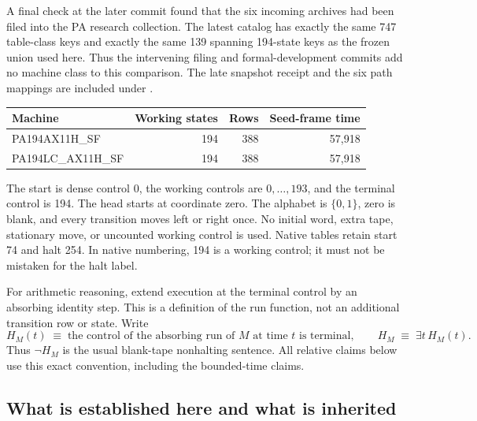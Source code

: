\documentclass[11pt,letterpaper]{article}
\newcommand{\file}[1]{\path{#1}}
\begin{document}
A final check at the later commit
 found that the six incoming
archives had been filed into the PA research collection. The latest catalog
has exactly the same 747 table-class keys and exactly the same 139 spanning
194-state keys as the frozen union used here. Thus the intervening filing
and formal-development commits add no machine class to this comparison.
The late snapshot receipt and the six path mappings are included under
\file{comparison/}.

\begin{center}
\begin{tabular}{@{}lrrr@{}}
\toprule
Machine & Working states & Rows & Seed-frame time\\
\midrule
PA194AX11H\_SF & 194 & 388 & 57,918\\
PA194LC\_AX11H\_SF & 194 & 388 & 57,918\\
\bottomrule
\end{tabular}
\end{center}

The start is dense control 0, the working controls are $0,\ldots,193$, and
the terminal control is 194. The head starts at coordinate zero. The alphabet
is $\{0,1\}$, zero is blank, and every transition moves left or right once.
No initial word, extra tape, stationary move, or uncounted working control
is used. Native tables retain start 74 and halt 254. In native numbering,
194 is a working control; it must not be mistaken for the halt label.

For arithmetic reasoning, extend execution at the terminal control by an
absorbing identity step. This is a definition of the run function, not an
additional transition row or state. Write
\[
 H_M(t)\;\equiv\;\text{the control of the absorbing run of $M$ at time $t$ is terminal},
 \qquad H_M\;\equiv\;\exists t\,H_M(t).
\]
Thus $\neg H_M$ is the usual blank-tape nonhalting sentence. All relative
claims below use this exact convention, including the bounded-time claims.

\subsection{What is established here and what is inherited}
\end{document}
